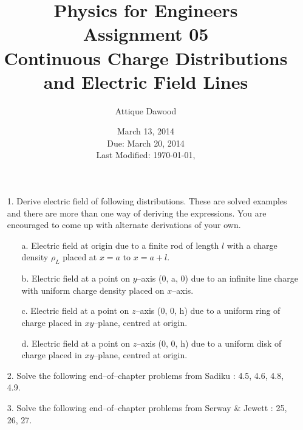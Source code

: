\documentclass[12pt,a4paper]{article}
\title{\vspace{-3cm}Physics for Engineers\\Assignment 05\\Continuous Charge Distributions and Electric Field Lines}
\author{Attique Dawood}
\date{March 13, 2014\\Due: March 20, 2014\\[0.2cm] Last Modified: \today, \currenttime}
\begin{document}
\maketitle
\begin{itemize}
\item[1.] Derive electric field of following distributions. These are solved examples and there are more than one way of deriving the expressions. You are encouraged to come up with alternate derivations of your own.
\begin{itemize}
\item[a.] Electric field at origin due to a finite rod of length $l$ with a charge density $\rho_L$ placed at $x=a$ to $x=a+l$.
\item[b.] Electric field at a point on $y$--axis (0, a, 0) due to an infinite line charge with uniform charge density placed on $x$--axis.
\item[c.] Electric field at a point on $z$--axis (0, 0, h) due to a uniform ring of charge placed in $xy$--plane, centred at origin.
\item[d.] Electric field at a point on $z$--axis (0, 0, h) due to a uniform disk of charge placed in $xy$--plane, centred at origin.
\end{itemize}
\item[2.] Solve the following end--of--chapter problems from Sadiku \cite[Ch. 4, pg. 155]{Sadiku}: 4.5, 4.6, 4.8, 4.9.
\item[3.] Solve the following end--of--chapter problems from Serway \& Jewett \cite[Ch. 23, pg. 732--734]{Serway}: 25, 26, 27.
\end{itemize}


\end{document}
